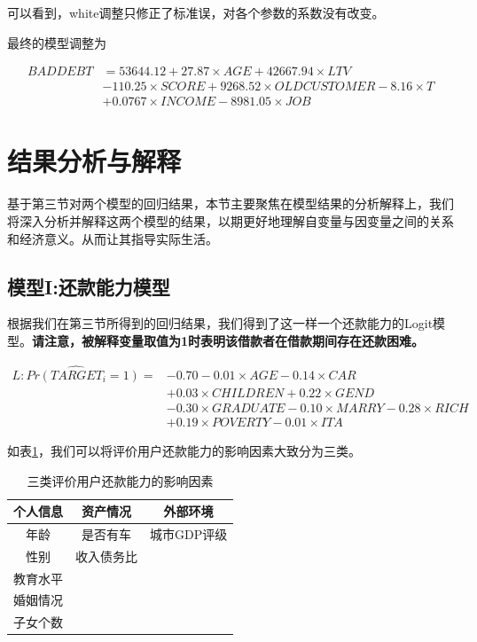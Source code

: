\documentclass[13.5pt,hyperref,a4paper,UTF8]{ctexart}
\begin{document}
可以看到，white调整只修正了标准误，对各个参数的系数没有改变。

最终的模型调整为

\begin{equation}
\begin{split}
 BADDEBT &= 53644.12 + 27.87\times AGE + 42667.94\times LTV \\ & - 110.25\times SCORE + 9268.52\times OLDCUSTOMER - 8.16\times T \\ & + 0.0767\times INCOME - 8981.05\times JOB
\end{split}
\end{equation}





\newpage
\section{结果分析与解释}
基于第三节对两个模型的回归结果，本节主要聚焦在模型结果的分析解释上，我们将深入分析并解释这两个模型的结果，以期更好地理解自变量与因变量之间的关系和经济意义。从而让其指导实际生活。
\subsection{模型I:还款能力模型}

根据我们在第三节所得到的回归结果，我们得到了这一样一个还款能力的Logit模型。\textbf{请注意，被解释变量取值为1时表明该借款者在借款期间存在还款困难。}

\begin{equation}
    \begin{split}
        \widehat{L:Pr(TARGET_i=1)}=&-0.70 - 0.01\times AGE - 0.14\times CAR \\ &  + 0.03\times CHILDREN + 0.22\times GEND \\ & - 0.30\times GRADUATE - 0.10\times MARRY - 0.28\times RICH \\ &  + 0.19\times POVERTY - 0.01\times ITA \nonumber
    \end{split}
\end{equation}

如表\ref{三类评价用户还款能力的影响因素}，我们可以将评价用户还款能力的影响因素大致分为三类。
\begin{table}[H]
\setlength{\belowcaptionskip}{0.2cm}
\centering
\caption{三类评价用户还款能力的影响因素}
\label{三类评价用户还款能力的影响因素}
\begin{tabular}{c|c|c}
\hline
\textbf{个人信息} & \textbf{资产情况}  &\textbf{ 外部环境}    \\ \hline
年龄   & 是否有车  & 城市GDP评级 \\
性别   & 收入债务比 &         \\
教育水平 &       &         \\
婚姻情况 &       &         \\
子女个数 &       &         \\ \hline
\end{tabular}
\end{table}
\end{document}
